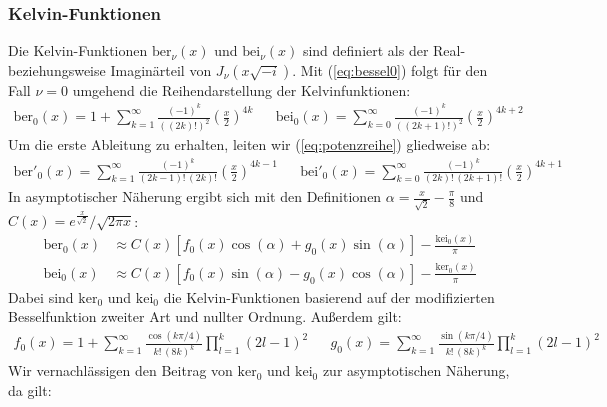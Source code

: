 \documentclass[10pt,a4paper]{article}
\begin{document}
\subsubsection{Kelvin-Funktionen}
\label{sssec:kelvin-funktionen}

Die Kelvin-Funktionen $\mathrm{ber}_\nu(x)$ und $\mathrm{bei}_\nu(x)$ sind definiert als der Real-
beziehungsweise Imaginärteil von $J_\nu(x \sqrt{-i} )$. Mit (\ref{eq:bessel0})
folgt für den Fall $\nu = 0$ umgehend die Reihendarstellung der Kelvinfunktionen:
\begin{align}
	\mathrm{ber}_0(x) = 1 + \sum^{\infty}_{k=1} \frac{\left( -1 \right)^k}{\left( \left(2k\right)! \right)^2} \left( \frac{x}{2} \right)^{4k}&&
	\mathrm{bei}_0(x) = \sum^{\infty}_{k=0} \frac{\left( -1 \right)^k}{\left( \left(2k+1\right)! \right)^2} \left( \frac{x}{2} \right)^{4k+2}\label{eq:potenzreihe}
\end{align}
Um die erste Ableitung zu erhalten, leiten wir (\ref{eq:potenzreihe}) gliedweise ab:
\begin{align}
	\mathrm{ber}'_0(x) = \sum^{\infty}_{k=1} \frac{\left( -1 \right)^k}{\left( 2k-1 \right)! \, \left( 2k \right)!} \left( \frac{x}{2} \right)^{4k-1}&&
	\mathrm{bei}'_0(x) = \sum^{\infty}_{k=0} \frac{\left( -1 \right)^k}{\left( 2k \right)! \, \left( 2k+1 \right)!} \left( \frac{x}{2} \right)^{4k+1}\label{eq:dpotenzreihe}
\end{align}
In asymptotischer Näherung \cite{abramowitzstegun} ergibt sich mit den Definitionen $\alpha = \frac{x}{\sqrt{2}}-\frac{\pi}{8}$ und $C(x) = e^{\frac{x}{\sqrt{2}}}/\sqrt{2 \pi x} $:
\begin{align}
	\mathrm{ber}_0(x) &\approx C(x) \left[f_0(x) \cos(\alpha) + g_0(x) \sin(\alpha) \right]\label{eq:berpotenzreiheasym}-\frac{\mathrm{kei}_0(x)}{\pi}\\
	\mathrm{bei}_0(x) &\approx C(x) \left[f_0(x) \sin(\alpha) - g_0(x) \cos(\alpha) \right]\label{eq:beipotenzreiheasym}-\frac{\mathrm{ker}_0(x)}{\pi}
\end{align}
Dabei sind $\mathrm{ker}_0$ und $\mathrm{kei}_0$ die Kelvin-Funktionen basierend auf der modifizierten Besselfunktion zweiter Art und nullter Ordnung.
Außerdem gilt:
\begin{align}
	f_0(x) = 1 + \sum^{\infty}_{k=1} \frac{\cos(k \pi / 4)}{k! \, (8k)^k} \prod^{k}_{l=1}(2l - 1)^2&&
	g_0(x) = \sum^{\infty}_{k=1} \frac{\sin(k \pi / 4)}{k! \, (8k)^k} \prod^{k}_{l=1}(2l - 1)^2\label{eq:f0g0}
\end{align}
Wir vernachlässigen den Beitrag von $\mathrm{ker}_0$ und $\mathrm{kei}_0$ zur asymptotischen Näherung, da gilt:
\end{document}
